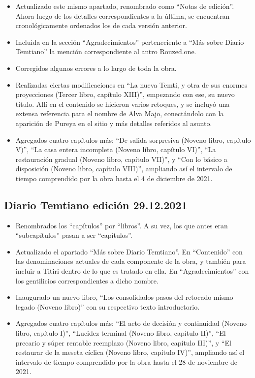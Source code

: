 \documentclass[
]{book}
\begin{document}
\begin{itemize}
\item
  Actualizado este mismo apartado, renombrado como ``Notas de edición''. Ahora luego de los detalles correspondientes a la última, se encuentran cronológicamente ordenados los de cada versión anterior.
\item
  Incluida en la sección ``Agradecimientos'' perteneciente a ``Más sobre Diario Temtiano'' la mención correspondiente al antro Rouzed.one.
\item
  Corregidos algunos errores a lo largo de toda la obra.
\item
  Realizadas ciertas modificaciones en ``La nueva Temti, y otra de sus enormes proyecciones (Tercer libro, capítulo XIII)'', empezando con ese, su nuevo título. Allí en el contenido se hicieron varios retoques, y se incluyó una extensa referencia para el nombre de Alva Majo, conectándolo con la aparición de Pureya en el sitio y más detalles referidos al asunto.
\item
  Agregados cuatro capítulos más: ``De salida sorpresiva (Noveno libro, capítulo V)'', ``La casa entera incompleta (Noveno libro, capítulo VI)'', ``La restauración gradual (Noveno libro, capítulo VII)'', y ``Con lo básico a disposición (Noveno libro, capítulo VIII)'', ampliando así el intervalo de tiempo comprendido por la obra hasta el 4 de diciembre de 2021.
\end{itemize}

\hypertarget{diario-temtiano-ediciuxf3n-29.12.2021}{%
\subsection*{Diario Temtiano edición 29.12.2021}\label{diario-temtiano-ediciuxf3n-29.12.2021}}

\begin{itemize}
\item
  Renombrados los ``capítulos'' por ``libros''. A su vez, los que antes eran ``subcapítulos'' pasan a ser ``capítulos''.
\item
  Actualizado el apartado ``Más sobre Diario Temtiano''. En ``Contenido'' con las denominaciones actuales de cada componente de la obra, y también para incluir a Titiri dentro de lo que es tratado en ella. En ``Agradecimientos'' con los gentilicios correspondientes a dicho nombre.
\item
  Inaugurado un nuevo libro, ``Los consolidados pasos del retocado mismo legado (Noveno libro)'' con su respectivo texto introductorio.
\item
  Agregados cuatro capítulos más: ``El acto de decisión y continuidad (Noveno libro, capítulo I)'', ``Lucidez terminal (Noveno libro, capítulo II)'', ``El precario y súper rentable reemplazo (Noveno libro, capítulo III)'', y ``El restaurar de la meseta cíclica (Noveno libro, capítulo IV)'', ampliando así el intervalo de tiempo comprendido por la obra hasta el 28 de noviembre de 2021.
\end{itemize}
\end{document}
